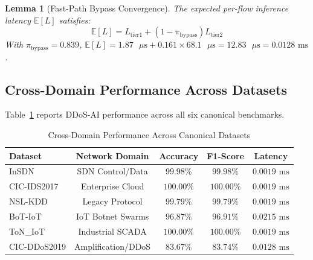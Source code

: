 \documentclass[journal]{IEEEtran}
\newtheorem{lemma}{Lemma}
\begin{document}
\begin{lemma}[Fast-Path Bypass Convergence]
The expected per-flow inference latency $\mathbb{E}[L]$ satisfies:
\begin{equation}
\mathbb{E}[L] = L_{\text{tier1}} + (1 - \pi_{\text{bypass}}) L_{\text{tier2}}
\end{equation}
With $\pi_{\text{bypass}} = 0.839$, $\mathbb{E}[L] = 1.87\text{ }\mu\text{s} + 0.161 \times 68.1\text{ }\mu\text{s} = 12.83\text{ }\mu\text{s} = 0.0128\text{ ms}$.
\end{lemma}

\subsection{Cross-Domain Performance Across Datasets}
Table~\ref{tab:multidataset} reports DDoS-AI performance across all six canonical benchmarks.

\begin{table}[h]
\centering
\caption{Cross-Domain Performance Across Canonical Datasets}
\label{tab:multidataset}
\begin{tabular}{lcccc}
\toprule
\textbf{Dataset} & \textbf{Network Domain} & \textbf{Accuracy} & \textbf{F1-Score} & \textbf{Latency} \\
\midrule
InSDN & SDN Control/Data & $99.98\%$ & $99.98\%$ & $0.0019\text{ ms}$ \\
CIC-IDS2017 & Enterprise Cloud & $100.00\%$ & $100.00\%$ & $0.0019\text{ ms}$ \\
NSL-KDD & Legacy Protocol & $99.79\%$ & $99.79\%$ & $0.0019\text{ ms}$ \\
BoT-IoT & IoT Botnet Swarms & $96.87\%$ & $96.91\%$ & $0.0215\text{ ms}$ \\
ToN\_IoT & Industrial SCADA & $100.00\%$ & $100.00\%$ & $0.0019\text{ ms}$ \\
CIC-DDoS2019 & Amplification/DDoS & $83.67\%$ & $83.74\%$ & $0.0128\text{ ms}$ \\
\bottomrule
\end{tabular}
\end{table}
\end{document}
